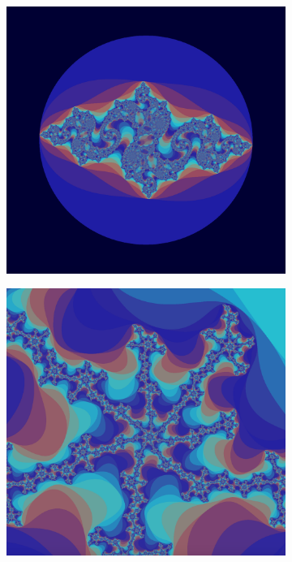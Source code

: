 \documentclass[a4paper]{article}
\begin{document}
\begin{figure}
    \centering
    \begin{subfigure}[b]{0.45\textwidth}
        \centering
        \includegraphics[width=\textwidth]{images/colorful1.png}
    \end{subfigure}
    \hfill
    \begin{subfigure}[b]{0.45\textwidth}
        \centering
        \includegraphics[width=\textwidth]{images/colorful2.png}

\end{subfigure}
\end{figure}
\end{document}
